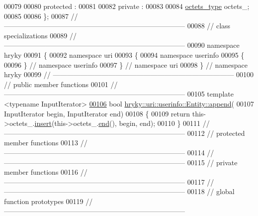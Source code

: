 \begin{DoxyCode}
00079 
00080 \textcolor{keyword}{protected} :
00081 
00082 \textcolor{keyword}{private} :
00083 
00084     \hyperlink{classhryky_1_1_vector}{octets_type} octets\_;
00085 
00086 \};
00087 \textcolor{comment}{//
      ------------------------------------------------------------------------------}
00088 \textcolor{comment}{// class specializations}
00089 \textcolor{comment}{//
      ------------------------------------------------------------------------------}
00090 \textcolor{keyword}{namespace }hryky
00091 \{
00092 \textcolor{keyword}{namespace }uri
00093 \{
00094 \textcolor{keyword}{namespace }userinfo
00095 \{
00096 \} \textcolor{comment}{// namespace userinfo}
00097 \} \textcolor{comment}{// namespace uri}
00098 \} \textcolor{comment}{// namespace hryky}
00099 \textcolor{comment}{//
      ------------------------------------------------------------------------------}
00100 \textcolor{comment}{// public member functions}
00101 \textcolor{comment}{//
      ------------------------------------------------------------------------------}
00105 \textcolor{comment}{}\textcolor{keyword}{template} <\textcolor{keyword}{typename} InputIterator>
\hypertarget{uri__userinfo__entity_8h_source_l00106}{}\hyperlink{classhryky_1_1uri_1_1userinfo_1_1_entity_a93e94cb484a2594f57fcfc39a3201130}{00106} \textcolor{keywordtype}{bool} \hyperlink{classhryky_1_1uri_1_1userinfo_1_1_entity_a93e94cb484a2594f57fcfc39a3201130}{hryky::uri::userinfo::Entity::append}(
00107     InputIterator begin, InputIterator end)
00108 \{
00109     \textcolor{keywordflow}{return} this->octets\_.\hyperlink{classhryky_1_1_vector_a5056ac0ef6663b935bea8271c33ff126}{insert}(this->octets\_.\hyperlink{classhryky_1_1_vector_ae17851e0d811d052645dd6e5a507f365}{end}(), begin, end);
00110 \}
00111 \textcolor{comment}{//
      ------------------------------------------------------------------------------}
00112 \textcolor{comment}{// protected member functions}
00113 \textcolor{comment}{//
      ------------------------------------------------------------------------------}
00114 \textcolor{comment}{//
      ------------------------------------------------------------------------------}
00115 \textcolor{comment}{// private member functions}
00116 \textcolor{comment}{//
      ------------------------------------------------------------------------------}
00117 \textcolor{comment}{//
      ------------------------------------------------------------------------------}
00118 \textcolor{comment}{// global function prototypes}
00119 \textcolor{comment}{//
      ------------------------------------------------------------------------------}

\end{DoxyCode}
